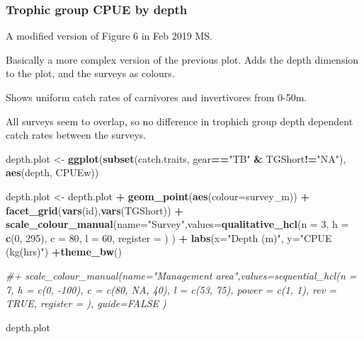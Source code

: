 \documentclass[]{article}
\newenvironment{Shaded}{\begin{snugshade}}{\end{snugshade}}
\newcommand{\KeywordTok}[1]{\textcolor[rgb]{0.13,0.29,0.53}{\textbf{#1}}}
\newcommand{\DataTypeTok}[1]{\textcolor[rgb]{0.13,0.29,0.53}{#1}}
\newcommand{\DecValTok}[1]{\textcolor[rgb]{0.00,0.00,0.81}{#1}}
\newcommand{\StringTok}[1]{\textcolor[rgb]{0.31,0.60,0.02}{#1}}
\newcommand{\CommentTok}[1]{\textcolor[rgb]{0.56,0.35,0.01}{\textit{#1}}}
\newcommand{\OperatorTok}[1]{\textcolor[rgb]{0.81,0.36,0.00}{\textbf{#1}}}
\newcommand{\NormalTok}[1]{#1}
\begin{document}
\subsubsection{Trophic group CPUE by
depth}\label{trophic-group-cpue-by-depth}

A modified version of Figure 6 in Feb 2019 MS.

Basically a more complex version of the previous plot. Adds the depth
dimension to the plot, and the surveys as colours.

Shows uniform catch rates of carnivores and invertivores from 0-50m.

All surveys seem to overlap, so no difference in trophich group depth
dependent catch rates between the surveys.

\begin{Shaded}
\begin{Highlighting}[]
\NormalTok{depth.plot <-}\StringTok{ }\KeywordTok{ggplot}\NormalTok{(}\KeywordTok{subset}\NormalTok{(catch.traits, gear}\OperatorTok{==}\StringTok{"TB"} \OperatorTok{&}\StringTok{ }\NormalTok{TGShort}\OperatorTok{!=}\StringTok{"NA"}\NormalTok{), }\KeywordTok{aes}\NormalTok{(depth, CPUEw)) }

\NormalTok{depth.plot <-}\StringTok{ }\NormalTok{depth.plot }\OperatorTok{+}\StringTok{ }\KeywordTok{geom_point}\NormalTok{(}\KeywordTok{aes}\NormalTok{(}\DataTypeTok{colour=}\NormalTok{survey_m))  }\OperatorTok{+}\StringTok{ }\KeywordTok{facet_grid}\NormalTok{(}\KeywordTok{vars}\NormalTok{(id),}\KeywordTok{vars}\NormalTok{(TGShort)) }\OperatorTok{+}\StringTok{  }\KeywordTok{scale_colour_manual}\NormalTok{(}\DataTypeTok{name=}\StringTok{"Survey"}\NormalTok{,}\DataTypeTok{values=}\KeywordTok{qualitative_hcl}\NormalTok{(}\DataTypeTok{n =} \DecValTok{3}\NormalTok{, }\DataTypeTok{h =} \KeywordTok{c}\NormalTok{(}\DecValTok{0}\NormalTok{, }\DecValTok{295}\NormalTok{), }\DataTypeTok{c =} \DecValTok{80}\NormalTok{, }\DataTypeTok{l =} \DecValTok{60}\NormalTok{, }\DataTypeTok{register =}\NormalTok{ ) ) }\OperatorTok{+}\StringTok{ }\KeywordTok{labs}\NormalTok{(}\DataTypeTok{x=}\StringTok{"Depth (m)"}\NormalTok{, }\DataTypeTok{y=}\StringTok{"CPUE (kg(hrs)"}\NormalTok{)  }\OperatorTok{+}\KeywordTok{theme_bw}\NormalTok{()  }

\CommentTok{#+ scale_colour_manual(name="Management area",values=sequential_hcl(n = 7, h = c(0, -100), c = c(80, NA, 40), l = c(53, 75), power = c(1, 1), rev = TRUE, register = ), guide=FALSE )}

\NormalTok{depth.plot}
\end{Highlighting}
\end{Shaded}
\end{document}
